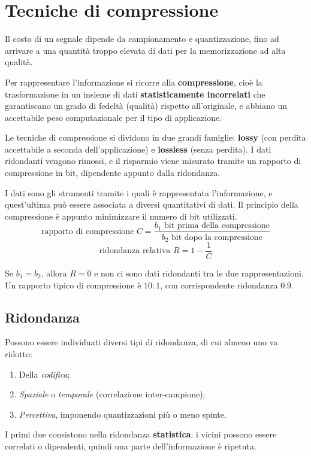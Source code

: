 \section{Tecniche di compressione}
Il costo di un segnale dipende da campionamento e quantizzazione, fino ad arrivare a una quantità troppo elevata di dati per la memorizzazione ad alta qualità.

Per rappresentare l'informazione si ricorre alla \textbf{compressione}, cioè la trasformazione in un insieme di dati \textbf{statisticamente incorrelati} che garantiscano un grado di fedeltà (qualità) rispetto all'originale, e abbiano un accettabile peso computazionale per il tipo di applicazione.

Le tecniche di compressione si dividono in due grandi famiglie: \textbf{lossy} (con perdita accettabile a seconda dell'applicazione) e \textbf{lossless} (senza perdita). I dati ridondanti vengono rimossi, e il risparmio viene misurato tramite un rapporto di compressione in bit, dipendente appunto dalla ridondanza. 

I dati sono gli strumenti tramite i quali è rappresentata l'informazione, e quest'ultima può essere associata a diversi quantitativi di dati. Il principio della compressione è appunto minimizzare il numero di bit utilizzati. 
$$\text{rapporto di compressione } C = \frac{b_1 \text{ bit prima della compressione}}{b_2 \text{ bit dopo la compressione}}$$
$$\text{ridondanza relativa } R = 1 - \frac{1}{C}$$

Se $b_1 = b_2$, allora $R = 0$ e non ci sono dati ridondanti tra le due rappresentazioni. Un rapporto tipico di compressione è $10 : 1$, con corrispondente ridondanza $0.9$.

\subsection{Ridondanza}
Possono essere individuati diversi tipi di ridondanza, di cui almeno uno va ridotto:
\begin{enumerate}
	\item Della \textit{codifica};
	\item \textit{Spaziale} o \textit{temporale} (correlazione inter-campione);
	\item \textit{Percettiva}, imponendo quantizzazioni più o meno spinte.
\end{enumerate}

I primi due consistono nella ridondanza \textbf{statistica}: i vicini possono essere correlati o dipendenti, quindi una parte dell'informazione è ripetuta. 

